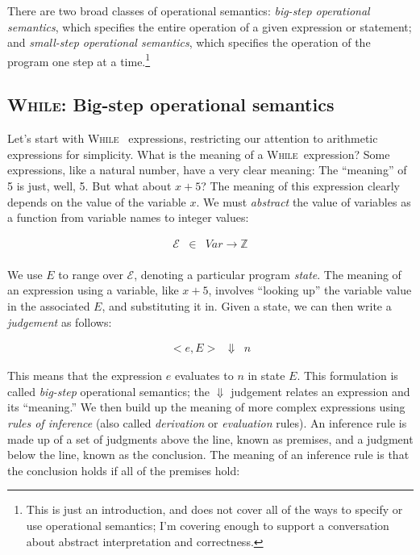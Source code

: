 \documentclass[11pt]{article}
\def\Integer{\mathbb{Z}}
\def\While{\textsc{While}}
\begin{document}
There are two broad classes of operational semantics: \emph{big-step operational
  semantics}, which specifies the entire operation of a given expression or
statement; and \emph{small-step operational semantics}, which specifies the
operation of the program one step at a time.\footnote{This is just an introduction, 
and does not cover all of the ways to specify or use operational semantics; I'm covering 
enough to support a conversation about abstract interpretation and correctness.}

\subsection{\While: Big-step operational semantics}

Let's start with \While~
expressions, restricting our attention to arithmetic expressions for simplicity.
What is the meaning of a \While~expression?  Some expressions, like a natural number, have
a very clear meaning: The ``meaning'' of 5 is just, well, 5.  But what about $x
+ 5$?  The meaning of this expression clearly depends on the value of the
variable $x$.  We must \emph{abstract} the value of variables as a function from
variable names to integer values:

\[
\begin{array}{lll}

\mathcal{E} & \in & \textit{Var} \rightarrow \Integer \\[1ex]
\end{array}
\]

\noindent We use $E$ to range over $\mathcal{E}$, denoting a particular program
\emph{state}.  The meaning of an expression using a
variable, like $x + 5$, involves ``looking up'' the variable value in the associated $E$, and
substituting it in.  
%
Given a state, we can then write a \emph{judgement} as follows:

\[
\begin{array}{ccc}
<e, E> & \Downarrow & n
\end{array}
\]

\noindent This means that the expression $e$ evaluates to $n$ in state $E$.  This formulation is
called \emph{big-step} operational semantics; the $\Downarrow$ judgement
relates an expression and its ``meaning.''  
%
We then build up the meaning of more complex expressions using \emph{rules of
  inference} (also called \emph{derivation} or \emph{evaluation} rules).  An
inference rule is made up of a set of judgments above the line, known as
premises, and a judgment below the line, known as the conclusion.  The meaning
of an inference rule is that the conclusion holds if all of the premises hold:
\end{document}
